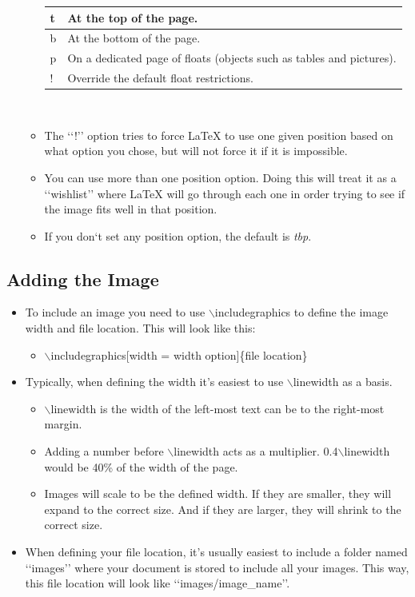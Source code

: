 \documentclass{article}
\begin{document}
\begin{itemize}
\begin{itemize}
\begin{tabularx}{\textwidth}{| l | X |}
						\hline
						t & At the top of the page.\\
						\hline
						b & At the bottom of the page.\\
						\hline
						p & On a dedicated page of floats (objects such as tables and pictures).\\
						\hline
						! & Override the default float restrictions.\\
						\hline
					\end{tabularx}\\
					\item The \lq\lq{}!\rq\rq{} option tries to force \LaTeX{} to use one given position based on what option you chose, but will not force it if it is impossible.
					\item You can use more than one position option. Doing this will treat it as a \lq\lq{}wishlist\rq\rq{} where \LaTeX{} will go through each one in order trying to see if the image fits well in that position.
					\item If you don\lq{}t set any position option, the default is \textit{tbp}.
				\end{itemize}	
			\end{itemize}
		
		\subsection{Adding the Image}
			\begin{itemize}
				\item To include an image you need to use $\backslash$includegraphics to define the image width and file location. This will look like this:
				\begin{itemize}
					\item $\backslash$includegraphics[width = width option]\{file location\}
				\end{itemize}
				\item Typically, when defining the width it\rq{}s easiest to use $\backslash$linewidth as a basis.
				\begin{itemize}
					\item $\backslash$linewidth is the width of the left-most text can be to the right-most margin.
					\item Adding a number before $\backslash$linewidth acts as a multiplier. 0.4$\backslash$linewidth would be 40\% of the width of the page.
					\item Images will scale to be the defined width. If they are smaller, they will expand to the correct size. And if they are larger, they will shrink to the correct size.
				\end{itemize}
				\item When defining your file location, it\rq{}s usually easiest to include a folder named \lq\lq{}images\rq\rq{} where your document is stored to include all your images. This way, this file location will look like \lq\lq{}images/image\_name\rq\rq{}.
			\end{itemize}
		
\end{document}
